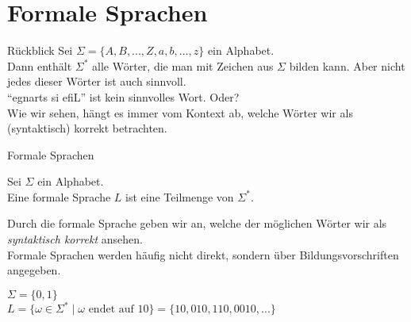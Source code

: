 \section{Formale Sprachen}

\begin{frame}{Rückblick}
	Sei $\Sigma = \{A, B, ..., Z, a, b, ..., z\}$ ein Alphabet.\\
	\pause
	Dann enthält $\Sigma^*$ alle Wörter, die man mit Zeichen aus $\Sigma$ bilden kann. Aber nicht jedes dieser Wörter ist auch sinnvoll.\\[1em]
	
	\enquote{egnarts si efiL} ist kein sinnvolles Wort. \pause Oder? \\[1em]
	\pause
	Wie wir sehen, hängt es immer vom Kontext ab, welche Wörter wir als (syntaktisch) korrekt betrachten.\\
	
\end{frame}

\begin{frame}{Formale Sprachen}
		\begin{Definition}
			Sei $\Sigma$ ein Alphabet.\\
			Eine formale Sprache $L$ ist eine Teilmenge von $\Sigma^*$.
		\end{Definition}
		\pause
		\vspace{10pt}
		Durch die formale Sprache geben wir an, welche der möglichen Wörter wir als  \emph{syntaktisch korrekt} ansehen.\\
		\pause
		Formale Sprachen werden häufig nicht direkt, sondern über Bildungsvorschriften angegeben.
		
		\pause
		\begin{Beispiel}
			$\Sigma = \{0, 1\}$ \\
			$L = \{ \omega \in \Sigma^* \mid \omega \text{ endet auf } 10 \}  = \{10, 010, 110, 0010, ...\}$
		\end{Beispiel}
\end{frame}

